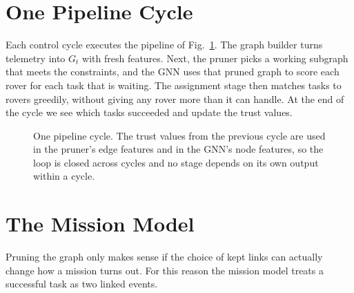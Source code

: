 \section{One Pipeline Cycle}

Each control cycle executes the pipeline of Fig.~\ref{fig:arch:cycle}. The
graph builder turns telemetry into $G_t$ with fresh features. Next, the pruner
picks a working subgraph that meets the constraints, and the GNN uses that
pruned graph to score each rover for each task that is waiting. The assignment
stage then matches tasks to rovers greedily, without giving any rover more
than it can handle. At the end of the cycle we see which tasks succeeded and
update the trust values.

\begin{figure}[htbp]
\centering
{}
\caption[One pipeline cycle.]{One pipeline cycle. The trust values from the previous cycle are
used in the pruner's edge features and in the GNN's node features, so the loop
is closed across cycles and no stage depends on its own output within a
cycle.}
\label{fig:arch:cycle}
\end{figure}


\section{The Mission Model}

Pruning the graph only makes sense if the choice of kept links can actually
change how a mission turns out. For this reason the mission model treats a
successful task as two linked events.

